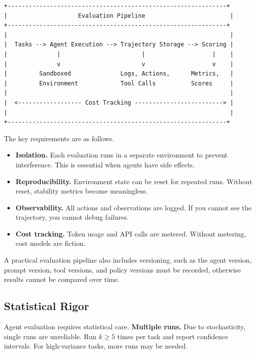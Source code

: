 {\footnotesize
\begin{verbatim}
+--------------------------------------------------------------+
|                    Evaluation Pipeline                        |
+--------------------------------------------------------------+
|                                                               |
|  Tasks --> Agent Execution --> Trajectory Storage --> Scoring |
|              |                       |                   |    |
|              v                       v                   v    |
|         Sandboxed              Logs, Actions,      Metrics,   |
|         Environment            Tool Calls          Scores     |
|                                                               |
|  <------------------ Cost Tracking -------------------------> |
|                                                               |
+--------------------------------------------------------------+
\end{verbatim}
}

The key requirements are as follows.
\begin{itemize}
\item \textbf{Isolation.} Each evaluation runs in a separate environment to prevent interference. This is essential when agents have side effects.
\item \textbf{Reproducibility.} Environment state can be reset for repeated runs. Without reset, stability metrics become meaningless.
\item \textbf{Observability.} All actions and observations are logged. If you cannot see the trajectory, you cannot debug failures.
\item \textbf{Cost tracking.} Token usage and API calls are metered. Without metering, cost models are fiction.
\end{itemize}

A practical evaluation pipeline also includes versioning, such as the agent version, prompt version, tool versions, and policy versions must be recorded, otherwise results cannot be compared over time.

\subsection{Statistical Rigor}

Agent evaluation requires statistical care. \textbf{Multiple runs.} Due to stochasticity, single runs are unreliable. Run $k \geq 5$ times per task and report confidence intervals. For high-variance tasks, more runs may be needed.

